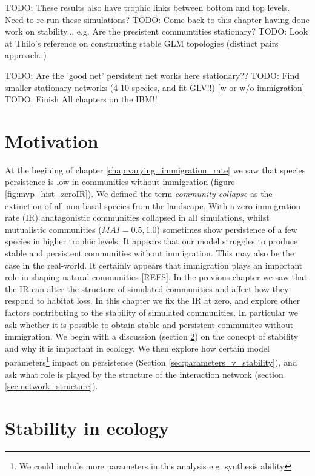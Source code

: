 TODO: These results also have trophic links between bottom and top levels. Need to re-run these simulations?
TODO: Come back to this chapter having done work on stability... e.g. Are the presistent communtities stationary?
TODO: Look at Thilo's reference on constructing stable GLM topologies (distinct pairs approach..)

TODO: Are the 'good net' persistent net works here stationary??
TODO: Find smaller stationary networks (4-10 species, and fit GLV!!) [w or w/o immigration]
TODO: Finish All chapters on the IBM!!

\section{Motivation}
\label{sec:motivate_stability}

At the begining of chapter \ref{chap:varying_immigration_rate} we saw that species persistence is low in communities without immigration (figure \ref{fig:mvp_hist_zeroIR}). We defined the term \emph{community collapse} as the extinction of all non-basal species from the landscape. With a zero immigration rate (IR) anatagonistic communities collapsed in all simulations, whilst mutualistic communities ($MAI=0.5,1.0$) sometimes show persistence of a few species in higher trophic levels. It appears that our model struggles to produce stable and persistent communities without immigration. This may also be the case in the real-world. It certainly appears that immigration plays an important role in shaping natural communities [REFS]. In the previous chapter we saw that the IR can alter the structure of simulated communities and affect how they respond to habitat loss. In this chapter we fix the IR at zero, and explore other factors contributing to the stability of simulated communities. In particular we ask whether it is possible to obtain stable and persistent communites without immigration. We begin with a discussion (section \ref{sec:lit_review_stability}) on the conecpt of stability and why it is important in ecology. We then explore how certain model parameters\footnote{We could include more parameters in this analysis e.g. synthesis ability} impact on persistence (Section \ref{sec:parameters_v_stability}), and ask what role is played by the structure of the interaction network (section \ref{sec:network_structure}).  

\section{Stability in ecology}
\label{sec:lit_review_stability}

